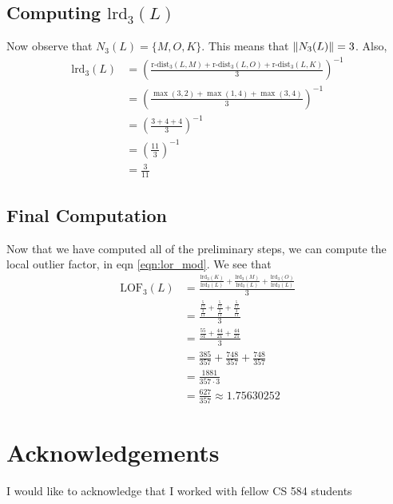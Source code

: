 \documentclass[a4paper,12pt]{article}
\theoremstyle{definition}
\theoremstyle{remark}
\newcommand{\rdist}{\text{r-dist}}
\newcommand{\lrd}{\text{lrd}}
\newcommand{\lof}{\text{LOF}}
\begin{document}
\subsection*{Computing $\lrd_3(L)$}
Now observe that $N_3(L) = \{M,O,K\}$. This means that $\norm{N_3(L)} = 3$. Also,
\begin{align*}
	\lrd_3(L) &= \left(\frac{\rdist_3(L,M) + \rdist_3(L,O) + \rdist_3(L,K)}{3}\right)^{-1}\\
	&=\left(\frac{\max(3,2) + \max(1,4) + \max(3,4)}{3}\right)^{-1}\\
	&= \left(\frac{3 + 4 + 4}{3}\right)^{-1}\\
	&= \left(\frac{11}{3}\right)^{-1}\\
	&=\frac{3}{11}
\end{align*}

\subsection*{Final Computation}
Now that we have computed all of the preliminary steps, we can compute the local outlier factor, in eqn \ref{eqn:lor_mod}.  We see that
\begin{align*}
	\lof_3(L) &= \frac{\frac{\lrd_3(K)}{\lrd_3(L)} + \frac{\lrd_3(M)}{\lrd_3(L)} + \frac{\lrd_3(O)}{\lrd_3(L)}}{3}\\
	&= \frac{\frac{\frac{5}{17}}{\frac{3}{11}}+ \frac{\frac{5}{17}}{\frac{3}{11}} + \frac{\frac{5}{17}}{\frac{3}{11}}}{3}\\
	&= \frac{\frac{55}{51} + \frac{44}{21} + \frac{44}{21}}{3}\\
	&= \frac{385}{357} + \frac{748}{357} + \frac{748}{357}\\
	&= \frac{1881}{357\cdot 3}\\
	&= \frac{627}{357} \approx 1.75630252
\end{align*} 



	
\section*{Acknowledgements}
	I would like to acknowledge that I worked with fellow CS 584 students 
	
\end{document}
